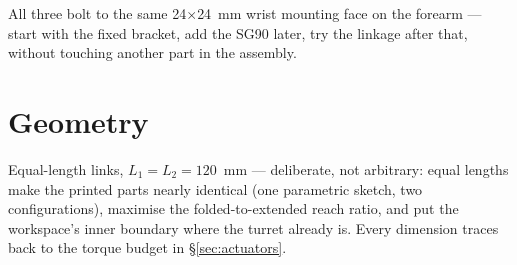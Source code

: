 \documentclass[11pt]{article}
\begin{document}
All three bolt to the same 24$\times$24~mm wrist mounting face on the forearm --- start with the fixed bracket, add the SG90 later, try the linkage after that, without touching another part in the assembly.

\section{Geometry}
\label{sec:geometry}

Equal-length links, $L_1=L_2=120$~mm --- deliberate, not arbitrary: equal lengths make the printed parts nearly identical (one parametric sketch, two configurations), maximise the folded-to-extended reach ratio, and put the workspace's inner boundary where the turret already is. Every dimension traces back to the torque budget in \S\ref{sec:actuators}.
\end{document}
